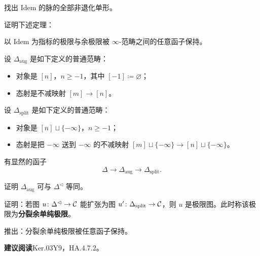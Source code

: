 \begin{exercise}\label{L7-A.3}
找出 $\mathrm{Idem}$ 的脉的全部非退化单形。
\end{exercise}

\begin{exercise}\label{L7-A.4}
证明下述定理：
\end{exercise}

\begin{theorem}\label{L7-A.5}
以 $\mathrm{Idem}$ 为指标的极限与余极限被 $\infty$-范畴之间的任意函子保持。
\end{theorem}

\begin{construction}\label{L7-A.6}
设 $\Delta_{\mathrm{aug}}$ 是如下定义的普通范畴：
\begin{itemize}[leftmargin=2.2em,itemsep=0.1em]
\item 对象是 $[n]$，$n\ge -1$，其中 $[-1]\coloneqq\varnothing$；
\item 态射是不减映射 $[m]\to[n]$。
\end{itemize}
设 $\Delta_{\mathrm{split}}$ 是如下定义的普通范畴：
\begin{itemize}[leftmargin=2.2em,itemsep=0.1em]
\item 对象是 $[n]\sqcup\{-\infty\}$，$n\ge -1$；
\item 态射是把 $-\infty$ 送到 $-\infty$ 的不减映射 $[m]\sqcup\{-\infty\}\to[n]\sqcup\{-\infty\}$。
\end{itemize}
有显然的函子
\[
\Delta\to\Delta_{\mathrm{aug}}\to\Delta_{\mathrm{split}}.
\]
\end{construction}

\begin{exercise}\label{L7-A.7}
证明 $\Delta_{\mathrm{aug}}$ 可与 $\Delta^{\lhd}$ 等同。
\end{exercise}

\begin{theorem}\label{L7-A.8}
证明：若图 $u\colon\Delta^{\lhd}\to\mathcal{C}$ 能扩张为图 $u'\colon\Delta_{\mathrm{split}}\to\mathcal{C}$，则 $u$ 是极限图。此时称该极限为\textbf{分裂余单纯极限}。
\end{theorem}

\begin{exercise}\label{L7-A.9}
推出：分裂余单纯极限被任意函子保持。
\end{exercise}

\nitem\label{L7-A.10} \textbf{建议阅读}\quad Ker.03Y9，HA.4.7.2。


